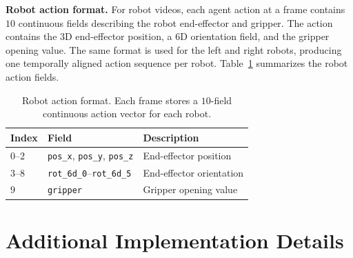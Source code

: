 \noindent\textbf{Robot action format.}
For robot videos, each agent action at a frame contains $10$ continuous fields describing the robot end-effector and gripper.
The action contains the 3D end-effector position, a 6D orientation field, and the gripper opening value.
The same format is used for the left and right robots, producing one temporally aligned action sequence per robot.
Table~\ref{tab:robot-action-format} summarizes the robot action fields.

\begin{table}[t]
  \centering
  \footnotesize
  \caption{Robot action format. Each frame stores a $10$-field continuous action vector for each robot.}
  \label{tab:robot-action-format}
  \vspace{4pt}
  \setlength{\tabcolsep}{4pt}
  \renewcommand{\arraystretch}{1.12}
  \begin{tabular}{@{}lll@{}}
    \toprule
    \textbf{Index} & \textbf{Field} & \textbf{Description} \\
    \midrule
    $0$--$2$ & \texttt{pos\_x}, \texttt{pos\_y}, \texttt{pos\_z} & End-effector position \\
    $3$--$8$ & \texttt{rot\_6d\_0}--\texttt{rot\_6d\_5} & End-effector orientation \\
    $9$ & \texttt{gripper} & Gripper opening value \\
    \bottomrule
  \end{tabular}
\end{table}


\section{Additional Implementation Details}
\label{app:additional_implementation_details}

